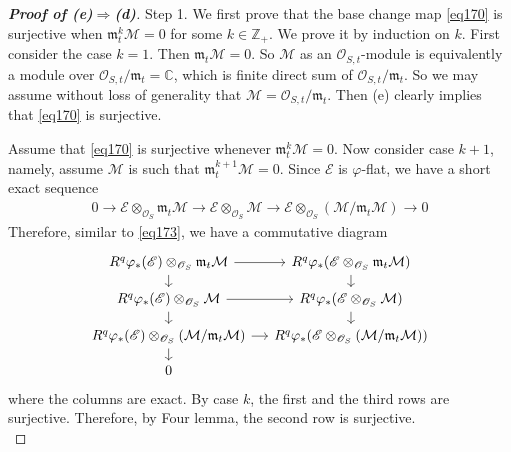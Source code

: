 \documentclass[12pt,b5paper,notitlepage]{report}
\theoremstyle{definition}
\theoremstyle{plain}
\newcommand{\mc}{\mathcal}
\newcommand{\scr}{\mathscr}
\newcommand{\Cbb}{\mathbb C}
\newcommand{\Zbb}{\mathbb Z}
\newcommand{\mk}{\mathfrak m}
\numberwithin{equation}{section}
\begin{document}
\begin{proof}[\textbf{Proof of (e)$\Rightarrow$(d)}]
Step 1. We first prove that the base change map \eqref{eq170} is surjective when $\mk_t^k\mc M=0$ for some $k\in\Zbb_+$. We prove it by induction on $k$. First consider the case $k=1$. Then $\mk_t\mc M=0$. So $\mc M$ as an $\scr O_{S,t}$-module  is equivalently a module over $\scr O_{S,t}/\mk_t=\Cbb$, which is finite direct sum of $\scr O_{S,t}/\mk_t$.  So we may assume without loss of generality that $\mc M=\scr O_{S,t}/\mk_t$. Then (e) clearly implies that \eqref{eq170} is surjective.

Assume that \eqref{eq170} is surjective whenever $\mk^k_t\mc M=0$. Now consider case $k+1$, namely, assume $\mc M$ is such that $\mk_t^{k+1}\mc M=0$. Since $\scr E$ is $\varphi$-flat, we have a short exact sequence
\begin{align*}
0\rightarrow \scr E\otimes_{\scr O_S}\mk_t\mc M\rightarrow \scr E\otimes_{\scr O_S}\mc M\rightarrow \scr E\otimes_{\scr O_S}(\mc M/\mk_t\mc M)\rightarrow0
\end{align*}
Therefore, similar to \eqref{eq173}, we have a commutative diagram
\begin{equation*}
\begin{tikzcd}[sep=small]
R^q\varphi_*(\scr E)\otimes_{\scr O_S}\mk_t\mc M\arrow[r] \arrow[d]           & R^q\varphi_*(\scr E\otimes_{\scr O_S}\mk_t\mc M) \arrow[d]           \\
R^q\varphi_*(\scr E)\otimes_{\scr O_S}\mc M \arrow[d] \arrow[r] & R^q\varphi_*(\scr E\otimes_{\scr O_S}\mc M) \arrow[d] \\
R^q\varphi_*(\scr E)\otimes_{\scr O_S}(\mc M/\mk_t\mc M) \arrow[r] \arrow[d]   & R^q\varphi_*(\scr E\otimes_{\scr O_S}(\mc M/\mk_t\mc M))                    \\
0                               &                      
\end{tikzcd}
\end{equation*}
where the columns are exact. By case $k$, the first and the third rows are surjective. Therefore, by Four lemma, the second row is surjective.\\


\end{proof}
\end{document}
